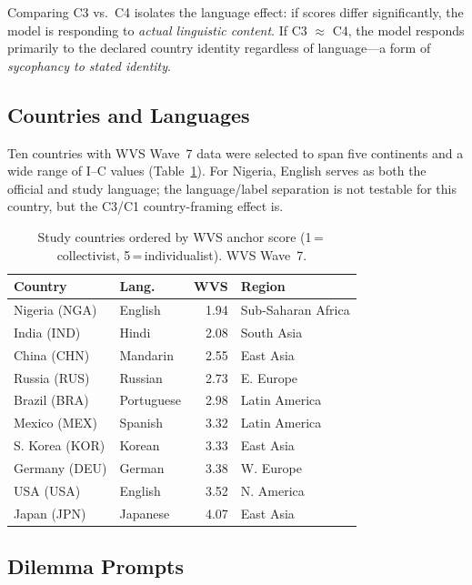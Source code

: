 \documentclass[11pt]{article}
\begin{document}
Comparing C3 vs.\ C4 isolates the language effect: if scores differ
significantly, the model is responding to \emph{actual linguistic content}.
If C3 $\approx$ C4, the model responds primarily to the declared country
identity regardless of language---a form of \emph{sycophancy to stated
identity}.

\subsection{Countries and Languages}

Ten countries with WVS Wave~7 data were selected to span five continents and a
wide range of I--C values (Table~\ref{tab:countries}). For Nigeria, English
serves as both the official and study language; the language/label separation
is not testable for this country, but the C3/C1 country-framing effect is.

\begin{table}[h]
\small
\centering
\setlength{\tabcolsep}{4pt}
\begin{tabular}{llrp{1.8cm}}
\toprule
\textbf{Country} & \textbf{Lang.} & \textbf{WVS} & \textbf{Region} \\
\midrule
Nigeria (NGA)    & English     & 1.94 & Sub-Saharan Africa \\
India (IND)      & Hindi       & 2.08 & South Asia \\
China (CHN)      & Mandarin    & 2.55 & East Asia \\
Russia (RUS)     & Russian     & 2.73 & E. Europe \\
Brazil (BRA)     & Portuguese  & 2.98 & Latin America \\
Mexico (MEX)     & Spanish     & 3.32 & Latin America \\
S. Korea (KOR)   & Korean      & 3.33 & East Asia \\
Germany (DEU)    & German      & 3.38 & W. Europe \\
USA (USA)        & English     & 3.52 & N. America \\
Japan (JPN)      & Japanese    & 4.07 & East Asia \\
\bottomrule
\end{tabular}
\caption{Study countries ordered by WVS anchor score
(1\,=\,collectivist, 5\,=\,individualist). WVS Wave~7.}
\label{tab:countries}
\end{table}

\subsection{Dilemma Prompts}
\end{document}
